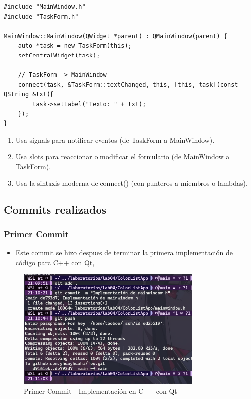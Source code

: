 \begin{lstlisting}[style=cpp-style, caption={MainWindow.cpp}]
#include "MainWindow.h"
#include "TaskForm.h"

MainWindow::MainWindow(QWidget *parent) : QMainWindow(parent) {
    auto *task = new TaskForm(this);
    setCentralWidget(task);

    // TaskForm -> MainWindow
    connect(task, &TaskForm::textChanged, this, [this, task](const QString &txt){
        task->setLabel("Texto: " + txt);
    });
}
\end{lstlisting}

\begin{enumerate}
    \item Usa signals para notificar eventos (de TaskForm a MainWindow).
    \item Usa slots para reaccionar o modificar el formulario (de MainWindow a TaskForm).
    \item Usa la sintaxis moderna de connect() (con punteros a miembros o lambdas).
\end{enumerate}


\subsection {Commits realizados}

\subsubsection {Primer Commit}

\begin{itemize}
    \item Este commit se hizo despues de terminar la primera implementación de código para C++ con Qt, 
\end{itemize}

\begin{figure}[H]
    \centering
    \includegraphics[width=0.8\textwidth]{img/Commit01.png}
    \caption{Primer Commit - Implementación en C++ con Qt}
    \label{fig:commit1}
\end{figure}


